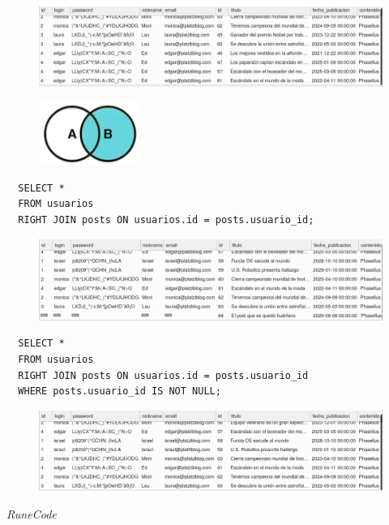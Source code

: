 \documentclass{article}
\begin{document}
\begin{figure}[h!]
  \centering
  \includegraphics[scale=0.75]{./Pictures/093_join_left_not_null.png}
\end{figure}


\begin{figure}[h!]
  \centering
  \includegraphics[scale=0.75]{./Pictures/091_join_right.png}
\end{figure}

\begin{verbatim}
  SELECT *
  FROM usuarios
  RIGHT JOIN posts ON usuarios.id = posts.usuario_id;
\end{verbatim}

\begin{figure}[h!]
  \centering
  \includegraphics[scale=0.75]{./Pictures/094_join_right.png}
\end{figure}


\begin{verbatim}
  SELECT *
  FROM usuarios
  RIGHT JOIN posts ON usuarios.id = posts.usuario_id
  WHERE posts.usuario_id IS NOT NULL;
\end{verbatim}

\begin{figure}[h!]
  \centering
  \includegraphics[scale=0.75]{./Pictures/095_join_right_not_null.png}
\end{figure}








\vspace{2cm}
\LARGE\textit{RuneCode}
\end{document}
